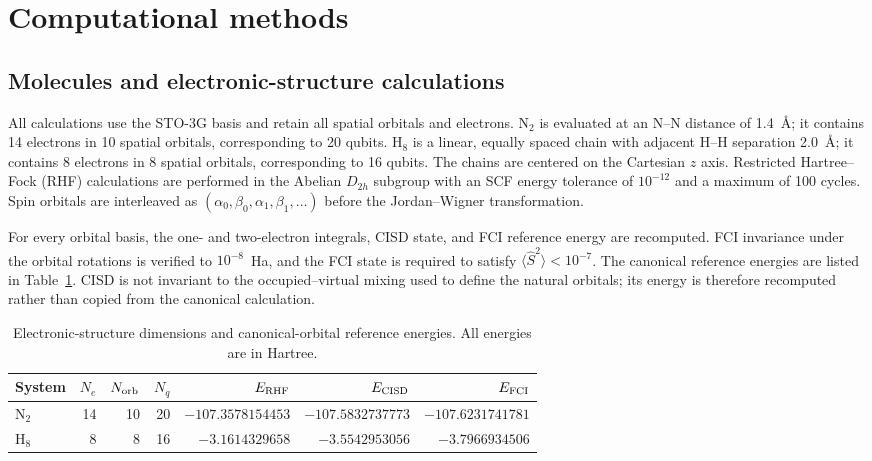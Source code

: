 \documentclass[a4paper,onecolumn,10pt]{article}
\begin{document}
\section{Computational methods}

\subsection{Molecules and electronic-structure calculations}

All calculations use the STO-3G basis and retain all spatial orbitals and
electrons.  N$_2$ is evaluated at an N--N distance of 1.4~\AA; it contains 14
electrons in 10 spatial orbitals, corresponding to 20 qubits.  H$_8$ is a
linear, equally spaced chain with adjacent H--H separation 2.0~\AA; it
contains 8 electrons in 8 spatial orbitals, corresponding to 16 qubits.  The
chains are centered on the Cartesian $z$ axis.  Restricted Hartree--Fock
(RHF) calculations are performed in the Abelian $D_{2h}$ subgroup with an SCF
energy tolerance of $10^{-12}$ and a maximum of 100 cycles.  Spin orbitals are
interleaved as $(\alpha_0,\beta_0,\alpha_1,\beta_1,\ldots)$ before the
Jordan--Wigner transformation.

For every orbital basis, the one- and two-electron integrals, CISD state, and
FCI reference energy are recomputed.  FCI invariance under the orbital
rotations is verified to $10^{-8}$~Ha, and the FCI state is required to satisfy
$\langle \hat S^2\rangle<10^{-7}$.  The canonical reference energies are
listed in Table~\ref{tab:electronic-structure}.  CISD is not invariant to the
occupied--virtual mixing used to define the natural orbitals; its energy is
therefore recomputed rather than copied from the canonical calculation.

\begin{table}[htbp]
\centering
\caption{Electronic-structure dimensions and canonical-orbital reference
energies.  All energies are in Hartree.}
\label{tab:electronic-structure}
\begin{tabular}{lrrrrrr}
\toprule
System & $N_e$ & $N_{\rm orb}$ & $N_q$ & $E_{\rm RHF}$ & $E_{\rm CISD}$ & $E_{\rm FCI}$ \\
\midrule
N$_2$ & 14 & 10 & 20 & $-107.3578154453$ & $-107.5832737773$ & $-107.6231741781$ \\
H$_8$ &  8 &  8 & 16 & $  -3.1614329658$ & $  -3.5542953056$ & $  -3.7966934506$ \\
\bottomrule
\end{tabular}
\end{table}
\end{document}

